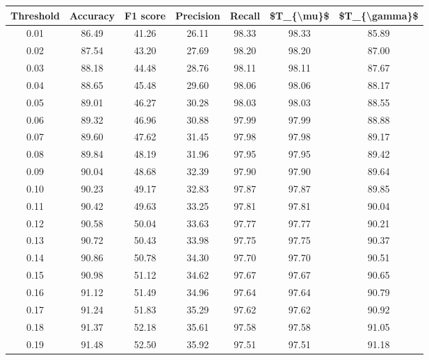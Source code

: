 \begin{tabular}{|c|c|c|c|c|c|c|}
\hline
 Threshold &  Accuracy &  F1 score &  Precision &  Recall &  \$T\_\{\textbackslash mu\}\$ &  \$T\_\{\textbackslash gamma\}\$ \\
\hline
      0.01 &     86.49 &     41.26 &      26.11 &   98.33 &      98.33 &         85.89 \\
      0.02 &     87.54 &     43.20 &      27.69 &   98.20 &      98.20 &         87.00 \\
      0.03 &     88.18 &     44.48 &      28.76 &   98.11 &      98.11 &         87.67 \\
      0.04 &     88.65 &     45.48 &      29.60 &   98.06 &      98.06 &         88.17 \\
      0.05 &     89.01 &     46.27 &      30.28 &   98.03 &      98.03 &         88.55 \\
      0.06 &     89.32 &     46.96 &      30.88 &   97.99 &      97.99 &         88.88 \\
      0.07 &     89.60 &     47.62 &      31.45 &   97.98 &      97.98 &         89.17 \\
      0.08 &     89.84 &     48.19 &      31.96 &   97.95 &      97.95 &         89.42 \\
      0.09 &     90.04 &     48.68 &      32.39 &   97.90 &      97.90 &         89.64 \\
      0.10 &     90.23 &     49.17 &      32.83 &   97.87 &      97.87 &         89.85 \\
      0.11 &     90.42 &     49.63 &      33.25 &   97.81 &      97.81 &         90.04 \\
      0.12 &     90.58 &     50.04 &      33.63 &   97.77 &      97.77 &         90.21 \\
      0.13 &     90.72 &     50.43 &      33.98 &   97.75 &      97.75 &         90.37 \\
      0.14 &     90.86 &     50.78 &      34.30 &   97.70 &      97.70 &         90.51 \\
      0.15 &     90.98 &     51.12 &      34.62 &   97.67 &      97.67 &         90.65 \\
      0.16 &     91.12 &     51.49 &      34.96 &   97.64 &      97.64 &         90.79 \\
      0.17 &     91.24 &     51.83 &      35.29 &   97.62 &      97.62 &         90.92 \\
      0.18 &     91.37 &     52.18 &      35.61 &   97.58 &      97.58 &         91.05 \\
      0.19 &     91.48 &     52.50 &      35.92 &   97.51 &      97.51 &         91.18 \\

\end{tabular}
